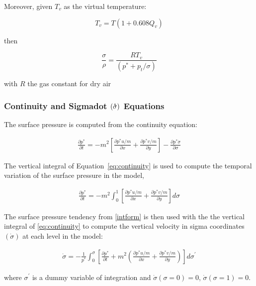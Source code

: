 Moreover, given $T_v$ as the virtual temperature:

\begin{equation}
T_v = T \left( 1 + 0.608 Q_v \right)
\end{equation}

then

\begin{equation}
\frac{\sigma}{\rho} = \frac{RT_v}{(p^{\ast} + p_t/\sigma)}
\end{equation}

with $R$ the gas constant for dry air

\subsubsection{Continuity and Sigmadot $({\bf \dot{\sigma}})$ Equations}

The surface pressure is computed from the continuity equation:

\begin{eqnarray} \label{eq:continuity}
\frac{\partial{p^{\ast}}}{\partial{t}} = 
  -m^2 \left[ \frac{\partial{p^{\ast}u/m}}{\partial{x}} +
        \frac{\partial{p^{\ast}v/m}}{\partial{y}} \right] -
  \frac{\partial{p^{\ast}\dot{\sigma}}}{\partial{\sigma}}
\end{eqnarray}

The vertical integral of Equation~\ref{eq:continuity} is used to
compute the temporal variation of the surface pressure in the model,

\begin{eqnarray}
\label{intform}
  \frac{\partial{p^{\ast}}}{\partial{t}} = -m^2 \int_{0}^{1}
  {\left[ \frac{\partial{p^{\ast}u/m}}{\partial{x}} + 
    \frac{\partial{p^{\ast}v/m}}{\partial{y}} \right] d\sigma}
\end{eqnarray}

The surface pressure tendency from \ref{intform} is then used with the
the vertical integral of \ref{eq:continuity} to compute the vertical
velocity in sigma coordinates $(\dot{\sigma})$ at each
level in the model:

\begin{eqnarray}
  \dot{\sigma} = - \frac{1}{p^{\ast}} \int_{0}^{\sigma}{
    \left[ \frac{\partial{p^{\ast}}}{\partial{t}} +
    m^2 \left(\frac{\partial{p^{\ast}u/m}}{\partial{x}} +
                     \frac{\partial{p^{\ast}v/m}}{\partial{y}}
   \right) \right] d\sigma^\prime}
\end{eqnarray}

where $\sigma^\prime$ is a dummy variable of integration and
$\dot{\sigma}(\sigma=0)=0$, $\dot{\sigma}(\sigma=1)= 0$.

